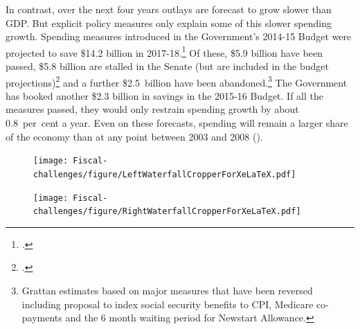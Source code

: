 \documentclass[twoside,english]{Dianab5ona4portrait}
\begin{document}
In contrast, over the next four years outlays are forecast to grow slower than GDP\@. But explicit policy measures only explain some of this slower spending growth. Spending measures introduced in the Government’s 2014-15 Budget were projected to save \$14.2 billion in 2017-18.\footcite[][BP~No.~2, p~47]{Treasury2015BudgetPapers201516}  Of these, \$5.9 billion have been passed, \$5.8 billion are stalled in the Senate (but are included in the budget projections)\footcite{PBO2015f}  and a further \$2.5~billion have been abandoned.\footnote{Grattan estimates based on major measures that have been reversed including proposal to index social security benefits to CPI, Medicare co-payments and the 6 month waiting period for Newstart Allowance.}  The Government has booked another \$2.3 billion in savings in the 2015-16 Budget. If all the measures passed, they would only restrain spending growth by about 0.8~per~cent a year.  Even on these forecasts, spending will remain a larger share of the economy than at any point between 2003 and 2008 (). 

\cleardoubleevenemptypage
\begin{figure}
\texttt{[image: Fiscal-challenges/figure/LeftWaterfallCropperForXeLaTeX.pdf]}
\end{figure}

\begin{figure}
\caption*{\null}
\texttt{[image: Fiscal-challenges/figure/RightWaterfallCropperForXeLaTeX.pdf]}
\caption*{\null}
\end{figure}


\FloatBarrier
\afterpage{\cleardoublepage}
\end{document}
